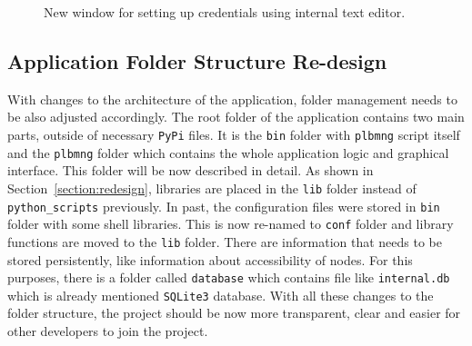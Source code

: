{{{{\begin{figure}[H]
	\centering
	\caption{New window for setting up credentials using internal text editor.}
	\label{fig:credentials}
\end{figure}

\subsection{Application Folder Structure Re-design}
With changes to the architecture of the application, folder management needs to be also adjusted accordingly. The root folder of the application contains two main parts, outside of necessary \texttt{PyPi} files. It is the \texttt{bin} folder with \texttt{plbmng} script itself and the \texttt{plbmng} folder which contains the whole application logic and graphical interface. This folder will be now described in detail. As shown in Section~\ref{section:redesign}, libraries are placed in the \texttt{lib} folder instead of \texttt{python\_scripts} previously. In past, the configuration files were stored in \texttt{bin} folder with some shell libraries. This is now re-named to \texttt{conf} folder and library functions are moved to the \texttt{lib} folder. There are information that needs to be stored persistently, like information about accessibility of nodes. For this purposes, there is a folder called \texttt{database} which contains file like \texttt{internal.db} which is already mentioned \texttt{SQLite3} database. With all these changes to the folder structure, the project should be now more transparent, clear and easier for other developers to join the project.

}}}}
